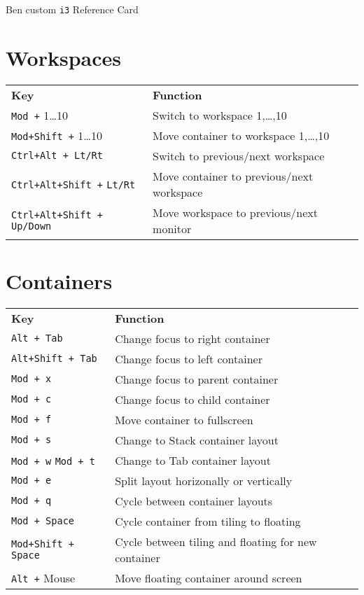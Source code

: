 \documentclass[landscape]{article}
\newcommand{\thead}[1]{{\color{black}\bf#1}}
\newcommand{\blankfirst}{%
  \ifodd\rownum\advance\rownum1\relax\fi}
\begin{document}
\thispagestyle{empty}
\begin{center}
  \Huge Ben custom \texttt{i3} Reference Card %
\end{center}

\begin{multicols}{3}
  \small
  \section*{Workspaces}
  \blankfirst
  \noindent\begin{tabular}{p{0.9in}p{2in}} %
    \thead{Key} & \thead{Function}\\
    \verb|Mod +| 1\dots10 & Switch to workspace 1,\dots,10\\
    \verb|Mod+Shift +| 1\dots10 & Move container to workspace 1,\dots,10\\
    \verb|Ctrl+Alt + Lt/Rt| & Switch to previous/next workspace\\
    \verb|Ctrl+Alt+Shift +| \verb|Lt/Rt| & Move container to previous/next workspace\\
    \verb|Ctrl+Alt+Shift +| \verb|Up/Down| & Move workspace to previous/next monitor\\
  \end{tabular}

  \section*{Containers}
  \blankfirst
  \noindent\begin{tabular}{p{0.9in}p{2in}} %
    \thead{Key} & \thead{Function}\\
    \verb|Alt + Tab| & Change focus to right container\\
    \verb|Alt+Shift + Tab| & Change focus to left container\\
    \verb|Mod + x| & Change focus to parent container\\
    \verb|Mod + c| & Change focus to child container\\
    \verb|Mod + f| & Move container to fullscreen\\
    \verb|Mod + s| & Change to Stack container layout\\
    \verb|Mod + w| \verb|Mod + t| & Change to Tab container layout\\
    \verb|Mod + e| & Split layout horizonally or vertically\\
    \verb|Mod + q| & Cycle between container layouts\\
    \verb|Mod + Space| & Cycle container from tiling to floating\\
    \verb|Mod+Shift +| \verb|Space| & Cycle between tiling and floating for new container\\
    \verb|Alt +| Mouse & Move floating container around screen\\
  \end{tabular}
  \columnbreak
 

\end{multicols}
\end{document}
